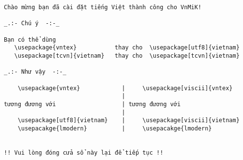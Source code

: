 \documentclass{article}
\begin{document}
\begin{verbatim}
Chào mừng bạn đã cài đặt tiếng Việt thành công cho VnMiK!

_.:- Chú ý  -:-_

Bạn có thể dùng
   \usepackage{vntex}           thay cho  \usepackage[utf8]{vietnam}
   \usepackage[tcvn]{vietnam}   thay cho  \usepackage[tcvn]{vietnam}

_.:- Như vậy  -:-_

    \usepackage{vntex}            |     \usepackage[viscii]{vntex} 
                                  |
tương đương với                   | tương đương với
                                  |
    \usepackage[utf8]{vietnam}    |     \usepackage[viscii]{vietnam}
    \usepacakge{lmodern}          |     \usepacakge{lmodern}


!! Vui lòng đóng cửa sổ này lại để tiếp tục !!	
\end{verbatim}
\end{document}
